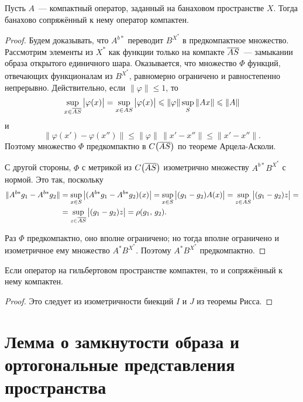 \documentclass{notes}
\begin{document}
	\begin{thm}
		Пусть $A$~--- компактный оператор, заданный на банаховом пространстве $X$. Тогда банахово сопряжённый к нему оператор компактен.
		\begin{proof}
			Будем доказывать, что $A^{b*}$ переводит $B^{X^*}$ в предкомпактное множество. Рассмотрим элементы из $X^*$ как функции только на компакте $\overline{AS}$~--- замыкании образа открытого единичного шара. Оказывается, что множество $\Phi$ функций, отвечающих функционалам из $B^{X^*}$, равномерно ограничено и равностепенно непрерывно. Действительно, если $\|\varphi\| \leqslant 1$, то
			\[
				\sup\limits_{x \in \overline{AS}} \big|\varphi(x)\big| = \sup\limits_{x \in AS} \big|\varphi(x)\big| \leqslant \|\varphi\| \sup\limits_{S} \|Ax\| \leqslant \|A\|
			\]
			и
			\[
				\big\|\varphi(x') - \varphi(x'')\big\| \leqslant \|\varphi\| \, \|x' - x''\| \leqslant \|x' - x''\|.
			\]
			Поэтому множество $\Phi$ предкомпактно в $C\big(\overline{AS}\big)$ по теореме Арцела-Асколи. 

			С другой стороны, $\Phi$ с метрикой из $C\big(\overline{AS}\big)$ изометрично множеству $A^{b*} B^{X^*}$ с нормой. Это так, поскольку
			\begin{align*}
				\|A^{b*} g_1 - A^{b*} g_2 \| &= \sup\limits_{x\in S} \big|(A^{b*} g_1 - A^{b*}g_2)(x)\big| = \sup\limits_{x\in S}  \big|(g_1 - g_2)A(x)\big| = \sup\limits_{z\in AS}  \big|(g_1 - g_2)z\big| = \\
				&= \sup\limits_{z\in \overline{AS}}  \big|(g_1 - g_2)z\big| = \rho(g_1, \, g_2).
			\end{align*}

			Раз $\Phi$ предкомпактно, оно вполне ограничено; но тогда вполне ограничено и изометричное ему множество $A^* B^{X^*}$. Поэтому $A^* B^{X^*}$ предкомпактно.
		\end{proof}
	\end{thm}

	\begin{cor}
		Если оператор на гильбертовом пространстве компактен, то и сопряжённый к нему компактен.
		\begin{proof}
			Это следует из изометричности биекций $I$ и $J$ из теоремы Рисса.
		\end{proof}
	\end{cor}

\section{Лемма о замкнутости образа и ортогональные представления пространства}
\end{document}
